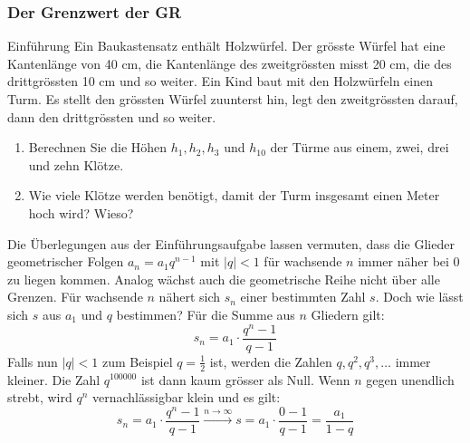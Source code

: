 \subsubsection{Der Grenzwert der GR}
\begin{LA}{Einführung}{}
    Ein Baukastensatz enthält Holzwürfel. Der grösste Würfel hat eine Kantenlänge von 40 cm, die Kantenlänge des zweitgrössten misst 20 cm, die des drittgrössten 10 cm und so weiter. Ein Kind baut mit den Holzwürfeln einen Turm. Es stellt den grössten Würfel zuunterst hin, legt den zweitgrössten darauf, dann den drittgrössten und so weiter.
    \begin{enumerate}
        \item Berechnen Sie die Höhen $h_1, h_2, h_3$ und $h_{10}$ der Türme aus einem, zwei, drei und zehn Klötze.
        \item Wie viele Klötze werden benötigt, damit der Turm insgesamt einen Meter hoch wird? Wieso?
    \end{enumerate}
\end{LA}
\newpage
Die Überlegungen aus der Einführungsaufgabe lassen vermuten, dass die Glieder geometrischer Folgen $a_n = a_1 q^{n-1}$ mit $|q|<1$ für wachsende $n$ immer näher bei $0$ zu liegen kommen.
Analog wächst auch die geometrische Reihe nicht über alle Grenzen. Für wachsende $n$ nähert sich $s_n$ einer bestimmten Zahl $s$. Doch wie lässt sich $s$ aus $a_1$ und $q$ bestimmen?
Für die Summe aus $n$ Gliedern gilt:
$$s_n = a_1\cdot \frac{q^n-1}{q-1}$$
Falls nun $|q| < 1$ zum Beispiel $q=\frac{1}{2}$ ist, werden die Zahlen $q,q^2,q^3,\ldots$ immer kleiner. Die Zahl $q^{100000}$ ist dann kaum grösser als Null. Wenn $n$ gegen unendlich strebt, wird $q^n$ vernachlässigbar klein und es gilt:
$$s_n = a_1\cdot \frac{q^n-1}{q-1}   \stackrel{n\rightarrow \infty}{\longrightarrow}   s = a_1\cdot \frac{0-1}{q-1} = \frac{a_1}{1-q}$$


